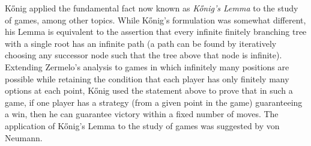 \documentclass{book}%
\begin{document}




K\H{o}nig  applied the fundamental fact now
known as \emph{K\H{o}nig's Lemma} to the study of
games, among other topics. While
K\H{o}nig's formulation was somewhat different, his Lemma is
equivalent to the assertion that every infinite finitely branching
tree with a single root has an infinite path (a path can be found by
iteratively choosing any successor node such that the tree above
that node is infinite). Extending Zermelo's analysis to games in
which infinitely many positions are possible while retaining the
condition that each player has only finitely many options at each
point, K\H{o}nig used the statement above to prove that in such a
game, if one player has a strategy (from a given point in the game)
guaranteeing a win, then he can guarantee victory within a fixed number of moves.
The application of K\H{o}nig's Lemma to
the study of games was suggested by von Neumann.
\end{document}

